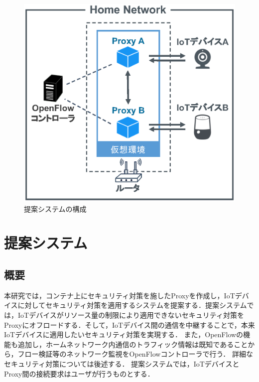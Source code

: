 \documentclass[a4paper,10pt,twocolumn,uplatex]{jsarticle}
\begin{document}
\begin{figure}[!tb]
  \centering
  \includegraphics[width=\linewidth]{img/system.eps}
  \caption{提案システムの構成}
  \label{fig:system}
\end{figure}

\section{提案システム}
\subsection{概要}
本研究では，コンテナ上にセキュリティ対策を施したProxyを作成し，IoTデバイスに対してセキュリティ対策を適用するシステムを提案する．提案システムでは，IoTデバイスがリソース量の制限により適用できないセキュリティ対策をProxyにオフロードする．そして，IoTデバイス間の通信を中継することで，本来IoTデバイスに適用したいセキュリティ対策を実現する．
また，OpenFlowの機能も追加し，ホームネットワーク内通信のトラフィック情報は既知であることから，フロー検証等のネットワーク監視をOpenFlowコントローラで行う．
詳細なセキュリティ対策については後述する．
提案システムでは，IoTデバイスとProxy間の接続要求はユーザが行うものとする．
\end{document}
